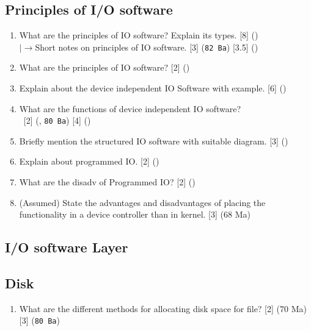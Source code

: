 \documentclass[12pt]{article}
\newcommand{\lb}{\\$\left|\rightarrow\right.$}
\newcommand{\enter}{\\\textcolor{white}{1}}
\begin{document}
	\subsection{Principles of I/O software}
		\begin{enumerate}[noitemsep, topsep=0pt]
			\item What are the principles of IO software? Explain its types. \hfill [8] ()
			\lb Short notes on principles of IO software. \hfill [3] (\texttt{82 Ba}) [3.5] ()

			\item What are the principles of IO software? \hfill [2] ()

			\item Explain about the device independent IO Software with example. \hfill [6] ()

			\item What are the functions of device independent IO software?
			\enter\hfill [2] (, \texttt{80 Ba}) [4] ()

			\item Briefly mention the structured IO software with suitable diagram. \hfill [3] ()

			\item Explain about programmed IO. \hfill [2] ()

			\item What are the disadv of Programmed IO? \hfill [2] ()

			\item (Assumed) State the advantages and disadvantages of placing the functionality in a device controller than in kernel. \hfill [3] (68 Ma)
		\end{enumerate}

	\subsection{I/O software Layer}
	\subsection{Disk}
		\begin{enumerate}[noitemsep, topsep=0pt]
			\item What are the different methods for allocating disk space for file? \hfill [2] (70 Ma) [3] (\texttt{80 Ba})
		\end{enumerate}
\end{document}

